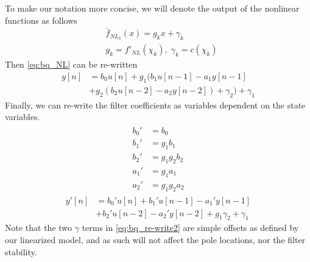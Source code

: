 \documentclass[twoside,a4paper]{article}
\begin{document}
To make our notation more concise, we will denote the
output of the nonlinear functions as follows
\begin{equation}
\begin{split}
    & \bar{f}_{NL_k}(x) = g_k x + \gamma_k \\
    & g_k = f'_{NL}(\chi_k), \; \gamma_k = c(\chi_k)
\end{split}
    \label{eq:linearized_bqnls}
\end{equation}
Then \cref{eq:bq_NL} can be re-written
%
\begin{equation}
\begin{split}
    y[n] &= b_0 u[n]
         + g_1 (b_1 u[n-1] - a_1 y[n-1] \\
         &+ g_2 (b_2 u[n-2] - a_2 y[n-2]) + \gamma_2) + \gamma_1
\end{split}
    \label{eq:bq_re-write}
\end{equation}
%
Finally, we can re-write the filter coefficients as variables dependent on
the state variables.
%
\begin{align}
\begin{split}
    b_0' &= b_0\\
    b_1' &= g_1 b_1\\
    b_2' &= g_1g_2 b_2\\
    a_1' &= g_1 a_1\\
    a_2' &= g_1g_2 a_2
\end{split}
    \label{eq:bq_coefs_re-write}
\end{align}
%
\begin{equation}
\begin{split}
    y'[n] &= b_0' u[n]
    + b_1' u[n-1] - a_1' y[n-1] \\
    & + b_2' u[n-2] - a_2' y[n-2]
    + g_1\gamma_2 + \gamma_1
\end{split}
    \label{eq:bq_re-write2}
\end{equation}
%
Note that the two $\gamma$ terms in \cref{eq:bq_re-write2} are simple
offsets as defined by our linearized model, and as such will not
affect the pole locations, nor the filter stability.
\end{document}
